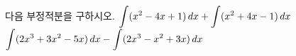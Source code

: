 다음 부정적분을 구하시오.
 $\displaystyle\int (x^2-4x+1)\mkern3mu dx+\int (x^2+4x-1)\mkern3mu dx$
 $\displaystyle\int (2x^3+3x^2-5x)\mkern3mu dx-\int (2x^3-x^2+3x)\mkern3mu dx$
